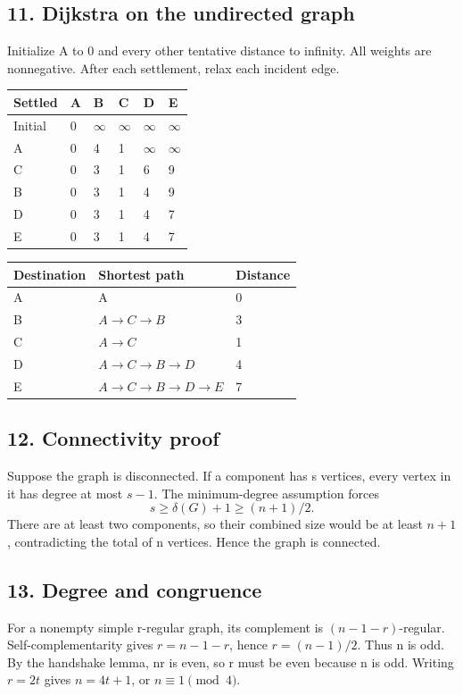 \documentclass[11pt,a4paper]{article}
\begin{document}
\noindent\begin{minipage}{\linewidth}\subsection*{11. Dijkstra on the undirected graph}
Initialize A to 0 and every other tentative distance to infinity. All weights are nonnegative. After each settlement, relax each incident edge.\begin{center}\renewcommand{\arraystretch}{1.2}\begin{tabular}{llllll}\hline Settled & A & B & C & D & E\\\hline
Initial & 0 & $\infty$ & $\infty$ & $\infty$ & $\infty$\\
A & 0 & 4 & 1 & $\infty$ & $\infty$\\
C & 0 & 3 & 1 & 6 & 9\\
B & 0 & 3 & 1 & 4 & 9\\
D & 0 & 3 & 1 & 4 & 7\\
E & 0 & 3 & 1 & 4 & 7\\\hline\end{tabular}\end{center}\begin{center}\renewcommand{\arraystretch}{1.2}\begin{tabular}{lll}\hline Destination & Shortest path & Distance\\\hline
A & A & 0\\
B & $A\to C\to B$ & 3\\
C & $A\to C$ & 1\\
D & $A\to C\to B\to D$ & 4\\
E & $A\to C\to B\to D\to E$ & 7\\\hline\end{tabular}\end{center}
\end{minipage}\par\medskip
\noindent\begin{minipage}{\linewidth}\subsection*{12. Connectivity proof}
Suppose the graph is disconnected. If a component has s vertices, every vertex in it has degree at most $s-1$. The minimum-degree assumption forces
\[s\ge\delta(G)+1\ge(n+1)/2.
\]
There are at least two components, so their combined size would be at least $n+1$, contradicting the total of n vertices. Hence the graph is connected.
\end{minipage}\par\medskip
\noindent\begin{minipage}{\linewidth}\subsection*{13. Degree and congruence}
For a nonempty simple r-regular graph, its complement is $(n-1-r)$-regular. Self-complementarity gives $r=n-1-r$, hence $\boxed{r=(n-1)/2}$. Thus n is odd. By the handshake lemma, nr is even, so r must be even because n is odd. Writing $r=2t$ gives $n=4t+1$, or $\boxed{n\equiv1\pmod4}$.
\end{minipage}\par\medskip
\end{document}
